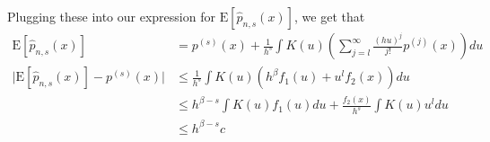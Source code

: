 \documentclass[11pt]{article}
\newcommand{\E}{\mathrm{E}}
\theoremstyle{definition}
\begin{document}
\begin{itemize}
\begin{itemize}
                Plugging these into our expression for \(\E[\hat p_{n,s}(x)]\), we get that 
                \begin{align*}
                    \E[\hat p_{n,s}(x)] &= p^{(s)}(x)+ \frac{1}{h^{s}}\int K(u)\left(\sum_{j=l}^\infty \frac{(hu)^j}{j!}p^{(j)}(x)\right) du \\
                    \vert \E[\hat p_{n,s}(x)]-p^{(s)}(x) \vert &\leq \frac{1}{h^{s}}\int K(u) (h^\beta f_1(u)+ u^lf_2(x)) du \\
                                                                &\leq h^{\beta-s}\int K(u) f_1(u) du + \frac{f_2(x)}{h^{s}}\int K(u) u^l du\\
                                                                &\leq h^{\beta-s}c
                \end{align*}


\end{itemize}
\end{itemize}
\end{document}
